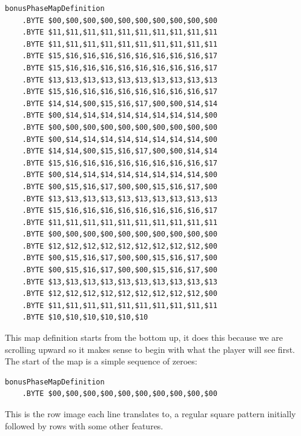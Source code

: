 \begin{lstlisting}
bonusPhaseMapDefinition 
    .BYTE $00,$00,$00,$00,$00,$00,$00,$00,$00,$00
    .BYTE $11,$11,$11,$11,$11,$11,$11,$11,$11,$11
    .BYTE $11,$11,$11,$11,$11,$11,$11,$11,$11,$11
    .BYTE $15,$16,$16,$16,$16,$16,$16,$16,$16,$17
    .BYTE $15,$16,$16,$16,$16,$16,$16,$16,$16,$17
    .BYTE $13,$13,$13,$13,$13,$13,$13,$13,$13,$13
    .BYTE $15,$16,$16,$16,$16,$16,$16,$16,$16,$17
    .BYTE $14,$14,$00,$15,$16,$17,$00,$00,$14,$14
    .BYTE $00,$14,$14,$14,$14,$14,$14,$14,$14,$00
    .BYTE $00,$00,$00,$00,$00,$00,$00,$00,$00,$00
    .BYTE $00,$14,$14,$14,$14,$14,$14,$14,$14,$00
    .BYTE $14,$14,$00,$15,$16,$17,$00,$00,$14,$14
    .BYTE $15,$16,$16,$16,$16,$16,$16,$16,$16,$17
    .BYTE $00,$14,$14,$14,$14,$14,$14,$14,$14,$00
    .BYTE $00,$15,$16,$17,$00,$00,$15,$16,$17,$00
    .BYTE $13,$13,$13,$13,$13,$13,$13,$13,$13,$13
    .BYTE $15,$16,$16,$16,$16,$16,$16,$16,$16,$17
    .BYTE $11,$11,$11,$11,$11,$11,$11,$11,$11,$11
    .BYTE $00,$00,$00,$00,$00,$00,$00,$00,$00,$00
    .BYTE $12,$12,$12,$12,$12,$12,$12,$12,$12,$00
    .BYTE $00,$15,$16,$17,$00,$00,$15,$16,$17,$00
    .BYTE $00,$15,$16,$17,$00,$00,$15,$16,$17,$00
    .BYTE $13,$13,$13,$13,$13,$13,$13,$13,$13,$13
    .BYTE $12,$12,$12,$12,$12,$12,$12,$12,$12,$00
    .BYTE $11,$11,$11,$11,$11,$11,$11,$11,$11,$11
    .BYTE $10,$10,$10,$10,$10,$10
\end{lstlisting}

This map definition starts from the bottom up, it does this because we
are scrolling upward so it makes sense to begin with what the player
will see first. The start of the map is a simple sequence of zeroes:

\begin{lstlisting}
bonusPhaseMapDefinition 
    .BYTE $00,$00,$00,$00,$00,$00,$00,$00,$00,$00
\end{lstlisting}

This is the row image each line translates to, a regular square pattern
initially followed by rows with some other features.

